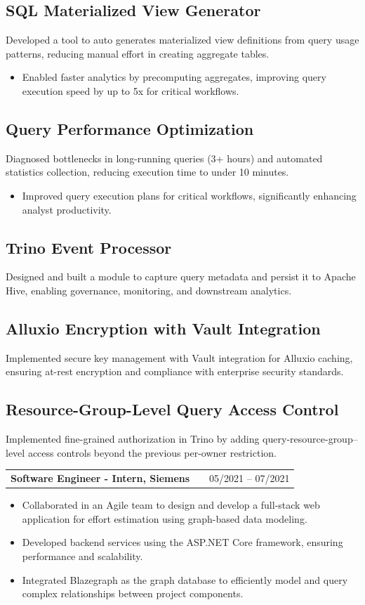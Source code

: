 \documentclass[a4paper,12pt]{article}
\makeatletter
\newenvironment{joblong}[2]
    {
    \begin{tabularx}{\linewidth}{@{}l X r@{}}
    \textbf{#1} & \hfill &  #2 \\[3.75pt]
    \end{tabularx}
    \begin{minipage}[t]{\linewidth}
    \begin{itemize}[nosep,after=\strut,leftmargin=1em,itemsep=3pt,label=$\bullet$]
    }
    {
    \end{itemize}
    \end{minipage}    
    }
\makeatother
\begin{document}
\subsection*{SQL Materialized View Generator}
Developed a tool to auto generates materialized view definitions from query usage patterns, reducing manual effort in creating aggregate tables.
\begin{itemize}[nosep, leftmargin=1.5em, label=$\bullet$]
\item Enabled faster analytics by precomputing aggregates, improving query execution speed by up to 5x for critical workflows.
\end{itemize}

\subsection*{Query Performance Optimization}
Diagnosed bottlenecks in long-running queries (3+ hours) and automated statistics collection, reducing execution time to under 10 minutes.
\begin{itemize}[nosep, leftmargin=1.5em, label=$\bullet$]
\item Improved query execution plans for critical workflows, significantly enhancing analyst productivity.
\end{itemize}

\subsection*{Trino Event Processor}
Designed and built a module to capture query metadata and persist it to Apache Hive, enabling governance, monitoring, and downstream analytics.

\subsection*{Alluxio Encryption with Vault Integration}
Implemented secure key management with Vault integration for Alluxio caching, ensuring at-rest encryption and compliance with enterprise security standards.

\subsection*{Resource-Group-Level Query Access Control}
Implemented fine-grained authorization in Trino by adding query-resource-group–level access controls beyond the previous per-owner restriction.

\begin{joblong}{Software Engineer - Intern, Siemens}{05/2021 – 07/2021}
\item Collaborated in an Agile team to design and develop a full-stack web application for effort estimation using graph-based data modeling.
\item Developed backend services using the ASP.NET Core framework, ensuring performance and scalability.
\item Integrated Blazegraph as the graph database to efficiently model and query complex relationships between project components.
\end{joblong}
\end{document}

